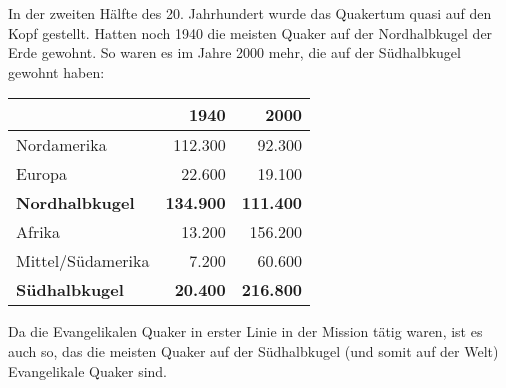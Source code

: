 \medskip

In der zweiten Hälfte des 20. Jahrhundert wurde das Quakertum quasi auf den Kopf
gestellt. Hatten noch 1940 die meisten Quaker auf der Nordhalbkugel der Erde
gewohnt. So waren es im Jahre 2000 mehr, die auf der Südhalbkugel gewohnt haben:

\begin{center}
\begin{tabular}{|l|r|r|} \hline
                        & \textbf{1940}        & \textbf{2000}    \\ \hline
\hline
Nordamerika             & 112.300              & 92.300           \\ \hline
Europa                  & 22.600               & 19.100           \\ \hline
\textbf{Nordhalbkugel}  & \textbf{134.900}     & \textbf{111.400} \\ \hline
Afrika                  & 13.200               & 156.200          \\ \hline
Mittel/Südamerika       & 7.200                & 60.600           \\ \hline
\textbf{Südhalbkugel}   & \textbf{20.400}      & \textbf{216.800} \\ \hline
\end{tabular}
\end{center}


Da die Evangelikalen Quaker in erster Linie in der Mission tätig waren, ist es
auch so, das die meisten Quaker auf der Südhalbkugel (und somit auf der Welt)
Evangelikale Quaker sind.